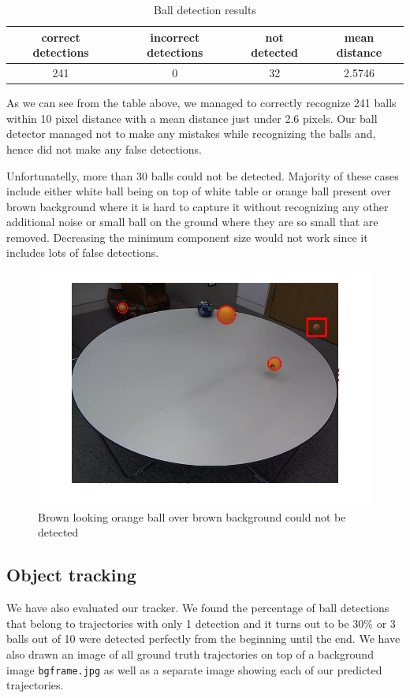 \documentclass[12pt,a4paper]{article}
\begin{document}
\begin{table}[h]
\centering
\begin{tabular}{@{}cccc@{}}
\toprule
correct detections & incorrect detections & not detected & mean distance \\ \midrule
241                & 0                    & 32           & 2.5746        \\ \bottomrule
\end{tabular}
\caption{Ball detection results}
\label{my-label}
\end{table}

As we can see from the table above, we managed to correctly recognize 241 balls within 10 pixel distance with a mean distance just under 2.6 pixels. Our ball detector managed not to make any mistakes while recognizing the balls and, hence did not make any false detections.

Unfortunatelly, more than 30 balls could not be detected. Majority of these cases include either white ball being on top of white table or orange ball present over brown background where it is hard to capture it without recognizing any other additional noise or small ball on the ground where they are so small that are removed. Decreasing the minimum component size would not work since it includes lots of false detections. 

\begin{figure}
	\centering
    \includegraphics[width=140mm]{mistakes/frame_55_missed_ball.png}
    \caption{Brown looking orange ball over brown background could not be detected}
	\label{my-label06}
\end{figure} 

\subsection{Object tracking}
We have also evaluated our tracker. We found the percentage of ball detections that belong to trajectories with only 1 detection and it turns out to be 30\% or 3 balls out of 10 were detected perfectly from the beginning until the end. We have also drawn an image of all ground truth trajectories on top of a background image \texttt{bgframe.jpg} as well as a separate image showing each of our predicted trajectories.
\end{document}
